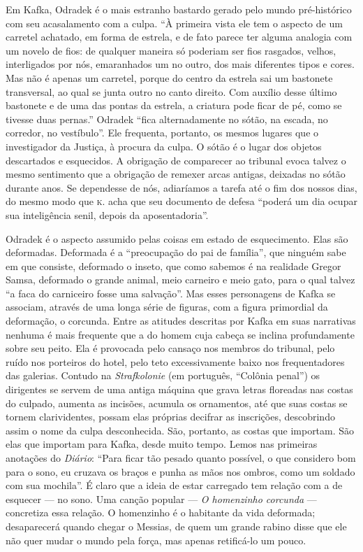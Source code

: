 Em Kafka, Odradek é o mais estranho bastardo gerado pelo mundo
pré-histórico com seu acasalamento com a culpa. ``À primeira vista ele
tem o aspecto de um carretel achatado, em forma de estrela, e de fato
parece ter alguma analogia com um novelo de fios: de qualquer maneira só
poderiam ser fios rasgados, velhos, interligados por nós, emaranhados um
no outro, dos mais diferentes tipos e cores. Mas não é apenas um
carretel, porque do centro da estrela sai um bastonete transversal, ao
qual se junta outro no canto direito. Com auxílio desse último bastonete
e de uma das pontas da estrela, a criatura pode ficar de pé, como se
tivesse duas pernas.'' Odradek ``fica alternadamente no sótão, na
escada, no corredor, no vestíbulo''. Ele frequenta, portanto, os mesmos
lugares que o investigador da Justiça, à procura da culpa. O sótão é o
lugar dos objetos descartados e esquecidos. A obrigação de comparecer ao
tribunal evoca talvez o mesmo sentimento que a obrigação de remexer
arcas antigas, deixadas no sótão durante anos. Se dependesse de nós,
adiaríamos a tarefa até o fim dos nossos dias, do mesmo modo que \textsc{k.} acha
que seu documento de defesa ``poderá um dia ocupar sua inteligência
senil, depois da aposentadoria''.

Odradek é o aspecto assumido pelas coisas em estado de esquecimento.
Elas são deformadas. Deformada é a ``preocupação do pai de família'',
que ninguém sabe em que consiste, deformado o inseto, que como sabemos é
na realidade Gregor Samsa, deformado o grande animal, meio carneiro e
meio gato, para o qual talvez ``a faca do carniceiro fosse uma
salvação''. Mas esses personagens de Kafka se associam, através de uma
longa série de figuras, com a figura primordial da deformação, o
corcunda. Entre as atitudes descritas por Kafka em suas narrativas
nenhuma é mais frequente que a do homem cuja cabeça se inclina
profundamente sobre seu peito. Ela é provocada pelo cansaço nos membros
do tribunal, pelo ruído nos porteiros do hotel, pelo teto excessivamente
baixo nos frequentadores das galerias. Contudo na \textit{Strafkolonie} (em português, ``Colônia
penal'') os dirigentes se servem de uma antiga máquina que grava letras
floreadas nas costas do culpado, aumenta as incisões, acumula os
ornamentos, até que suas costas se tornem clarividentes, possam elas
próprias decifrar as inscrições, descobrindo assim o nome da culpa
desconhecida. São, portanto, as costas que importam. São elas que
importam para Kafka, desde muito tempo. Lemos nas primeiras anotações do
\textit{Diário}: ``Para ficar tão pesado quanto possível, o que considero bom
para o sono, eu cruzava os braços e punha as mãos nos ombros, como um
soldado com sua mochila''. É claro que a ideia de estar carregado tem
relação com a de esquecer --- no sono. Uma canção popular --- \textit{O
homenzinho corcunda} --- concretiza essa relação. O homenzinho é o
habitante da vida deformada; desaparecerá quando chegar o Messias, de
quem um grande rabino disse que ele não quer mudar o mundo pela força,
mas apenas retificá-lo um pouco.

